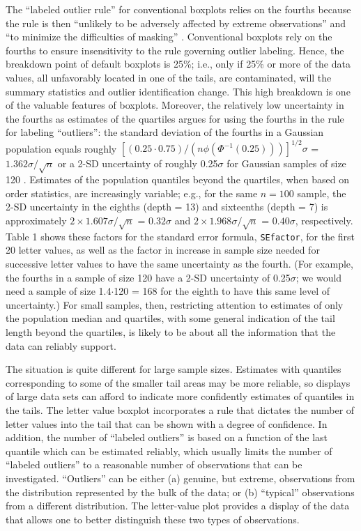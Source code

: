 \documentclass[oneside]{article}
\begin{document}
The ``labeled outlier rule'' for conventional boxplots relies on the fourths because the rule is then ``unlikely to be adversely affected by extreme observations'' and ``to minimize the difficulties of masking'' \citep{dchbox, page=992}. Conventional boxplots rely on the fourths to ensure insensitivity to the rule governing outlier labeling. Hence, the breakdown point of default boxplots is 25\%; i.e., only if 25\% or more of the data values, all unfavorably located in one of the tails, are contaminated, will the summary statistics and outlier identification change. This high breakdown is one of the valuable features of boxplots. Moreover, the relatively low uncertainty in the fourths as estimates of the quartiles argues for using the fourths in the rule for labeling ``outliers'': the standard deviation of the fourths in a Gaussian population equals roughly $[(0.25 \cdot 0.75) / (n \phi(\Phi^{-1}(0.25)))]^{1/2} \sigma$ = $1.362 \sigma / \sqrt{n}$ or a 2-SD uncertainty of roughly 0.25$\sigma$ for Gaussian samples of size 120 \citep{ha.order}. Estimates of the population quantiles beyond the quartiles, when based on order statistics, are increasingly variable; e.g., for the same $n = 100$ sample, the 2-SD uncertainty in the eighths (depth = 13) and sixteenths (depth = 7) is approximately $ 2 \times 1.607 \sigma / \sqrt{n}$ = $0.32 \sigma$ and $ 2 \times 1.968 \sigma / \sqrt{n}$ = $0.40 \sigma$, respectively. Table 1 shows these factors for the standard error formula, \texttt{SEfactor}, for the first 20 letter values, as well as the factor in increase in sample size needed for successive letter values to have the same uncertainty as the fourth. (For example, the fourths in a sample of size 120 have a 2-SD uncertainty of 0.25$\sigma$; we would need a sample of size 1.4$\cdot$120 = 168 for the eighth to have this same level of uncertainty.) For small samples, then, restricting attention to estimates of only the population median and quartiles, with some general indication of the tail length beyond the quartiles, is likely to be about all the information that the data can reliably support.

The situation is quite different for large sample sizes. Estimates with quantiles corresponding to some of the smaller tail areas may be more reliable, so displays of large data sets can afford to indicate more confidently estimates of quantiles in the tails. The letter value boxplot incorporates a rule that dictates the number of letter values into the tail that can be shown with a degree of confidence. In addition, the number of ``labeled outliers'' is based on a function of the last quantile which can be estimated reliably, which usually limits the number of ``labeled outliers'' to a reasonable number of observations that can be investigated. ``Outliers'' can be either (a) genuine, but extreme, observations from the distribution represented by the bulk of the data; or (b) ``typical'' observations from a different distribution. The letter-value plot provides a display of the data that allows one to better distinguish these two types of observations.
\end{document}
